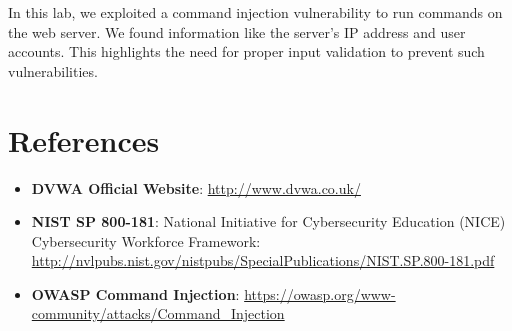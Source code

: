\documentclass[12pt]{article}
\begin{document}
In this lab, we exploited a command injection vulnerability to run commands on the web server. We found information like the server's IP address and user accounts. This highlights the need for proper input validation to prevent such vulnerabilities.

\section{References}

\begin{itemize}
    \item \textbf{DVWA Official Website}: \url{http://www.dvwa.co.uk/}
    \item \textbf{NIST SP 800-181}: National Initiative for Cybersecurity Education (NICE) Cybersecurity Workforce Framework: \url{http://nvlpubs.nist.gov/nistpubs/SpecialPublications/NIST.SP.800-181.pdf}
    \item \textbf{OWASP Command Injection}: \url{https://owasp.org/www-community/attacks/Command_Injection}
\end{itemize}
\end{document}
